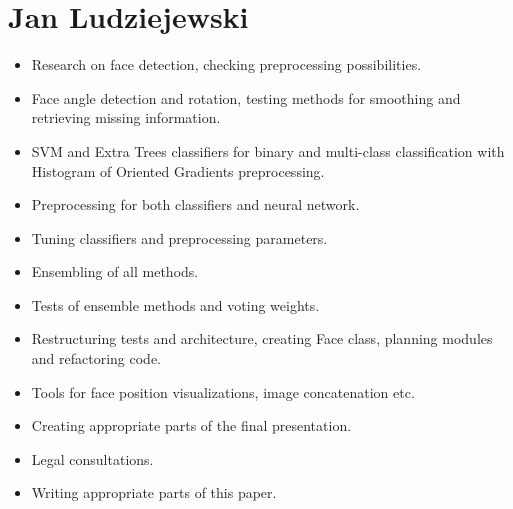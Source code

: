     \section{Jan Ludziejewski}
        \begin{itemize}
            \item Research on face detection, checking preprocessing possibilities.
            \item Face angle detection and rotation, testing methods for smoothing and retrieving missing information.
            \item SVM and Extra Trees classifiers for binary and multi-class
            classification with Histogram of Oriented Gradients preprocessing.
            \item Preprocessing for both classifiers and neural network.
            \item Tuning classifiers and preprocessing parameters.
            \item Ensembling of all methods.
            \item Tests of ensemble methods and voting weights.
            \item Restructuring tests and architecture, creating Face class, planning modules and refactoring code.
            \item Tools for face position visualizations, image concatenation etc.
            \item Creating appropriate parts of the final presentation.
	          \item Legal consultations.
            \item Writing appropriate parts of this paper.
        \end{itemize}

